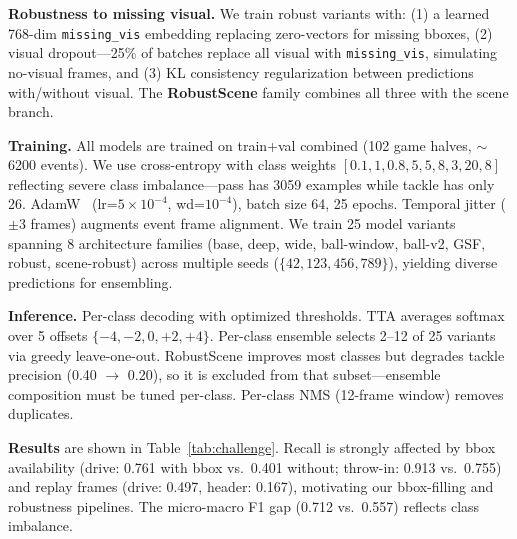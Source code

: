 \noindent\textbf{Robustness to missing visual.}
We train robust variants with: (1) a learned 768-dim \texttt{missing\_vis} embedding replacing zero-vectors for missing bboxes, (2) visual dropout---25\% of batches replace all visual with \texttt{missing\_vis}, simulating no-visual frames, and (3) KL consistency regularization between predictions with/without visual. The \textbf{RobustScene} family combines all three with the scene branch.

\noindent\textbf{Training.}
All models are trained on train+val combined (102 game halves, $\sim$6200 events). We use cross-entropy with class weights $[0.1, 1, 0.8, 5, 5, 8, 3, 20, 8]$ reflecting severe class imbalance---pass has 3059 examples while tackle has only 26. AdamW~\cite{loshchilov2019adamw} (lr=$5{\times}10^{-4}$, wd=$10^{-4}$), batch size 64, 25 epochs. Temporal jitter ($\pm$3 frames) augments event frame alignment. We train 25 model variants spanning 8 architecture families (base, deep, wide, ball-window, ball-v2, GSF, robust, scene-robust) across multiple seeds ($\{42, 123, 456, 789\}$), yielding diverse predictions for ensembling.

\noindent\textbf{Inference.}
Per-class decoding with optimized thresholds. TTA averages softmax over 5 offsets $\{-4,-2,0,+2,+4\}$. Per-class ensemble selects 2--12 of 25 variants via greedy leave-one-out. RobustScene improves most classes but degrades tackle precision (0.40 $\to$ 0.20), so it is excluded from that subset---ensemble composition must be tuned per-class. Per-class NMS (12-frame window) removes duplicates.

\noindent\textbf{Results} are shown in Table~\ref{tab:challenge}. Recall is strongly affected by bbox availability (drive: 0.761 with bbox vs.\ 0.401 without; throw-in: 0.913 vs.\ 0.755) and replay frames (drive: 0.497, header: 0.167), motivating our bbox-filling and robustness pipelines. The micro-macro F1 gap (0.712 vs.\ 0.557) reflects class imbalance.

